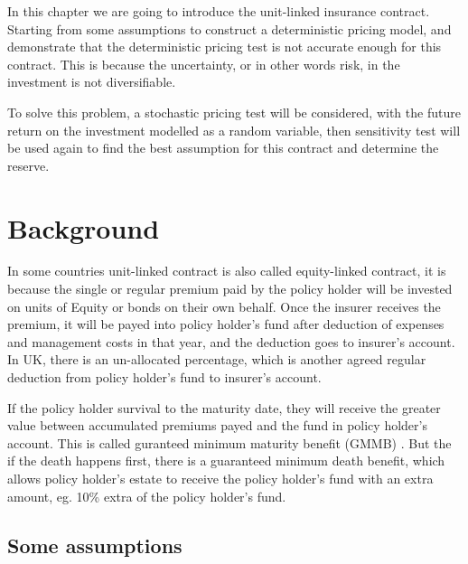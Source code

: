 \documentclass{report}
\begin{document}




In this chapter we are going to introduce the unit-linked insurance contract. Starting from some assumptions to construct a deterministic pricing model, and demonstrate that the deterministic pricing test is not accurate enough for this contract.
This is because the uncertainty, or in other words risk, in the investment is not diversifiable.  

To solve this problem, a stochastic pricing test will be considered, with the future return on the investment modelled as a random variable, then sensitivity test will be used again to find the best assumption for this contract and determine the reserve. 


\section{Background}

In some countries unit-linked contract is also called equity-linked contract, it is because the single or regular premium paid by the policy holder will be invested on units of Equity or bonds on their own behalf. Once the insurer receives the premium, it will be payed into policy holder's fund after deduction of expenses and management costs in that year, and the deduction goes to insurer's account. In UK, there is an un-allocated percentage, which is another agreed regular deduction from policy holder's fund to insurer's account.

If the policy holder survival to the maturity date, they will receive the greater value between accumulated premiums payed and the fund in policy holder's account. This is called guranteed minimum maturity benefit (GMMB) \cite{bib:GMMB}. But the if the death happens first, there is a guaranteed minimum death benefit, which allows policy holder's estate to receive the policy holder's fund with an extra amount, eg. 10\% extra of the policy holder's fund. 


\subsection{Some assumptions}  \label{unit-link-basic-assumptions}
\end{document}
